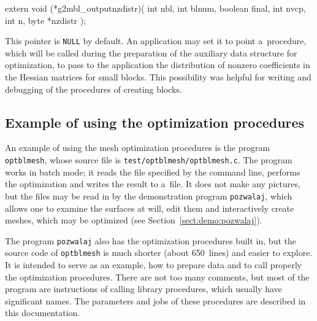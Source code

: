\medskip
\begin{listingC}
extern void (*g2mbl_outputnzdistr)( int nbl, int blnum,
                                    boolean final,
                                    int nvcp, int n, byte *nzdistr ); 
\end{listingC}
This pointer is \texttt{NULL} by default. An application may set it to point
a~procedure, which will be called during the preparation of the auxiliary
data structure for optimization, to pass to the application the distribution
of nonzero coefficients in the Hessian matrices for small blocks.
This possibility was helpful for writing and debugging of the procedures of
creating blocks.


\subsection{\label{ssect:g2mbl:example}Example of using the optimization procedures}

An example of using the mesh optimization procedures is the program
\texttt{optblmesh}, whose source file is
\texttt{test/optblmesh/optblmesh.c}. The program works in batch mode; it
reads the file specified by the command line, performs the optimization
and writes the result to a~file. It does not make any pictures, but the
files may be read in by the demonstration program \texttt{pozwalaj}, which
allows one to examine the surfaces at will, edit them and interactively
create meshes, which may be optimized (see Section~\ref{sect:demo:pozwalaj}).

The program \texttt{pozwalaj} also has the optimization procedures built in,
but the source code of \texttt{optblmesh} is much shorter (about 650~lines)
and easier to explore. It is intended to serve as an example, how to prepare
data and to call properly the optimization procedures. There are not too
many comments, but most of the program are instructions of calling
library procedures, which usually have significant names. The parameters
and jobs of these procedures are described in this documentation.
 
